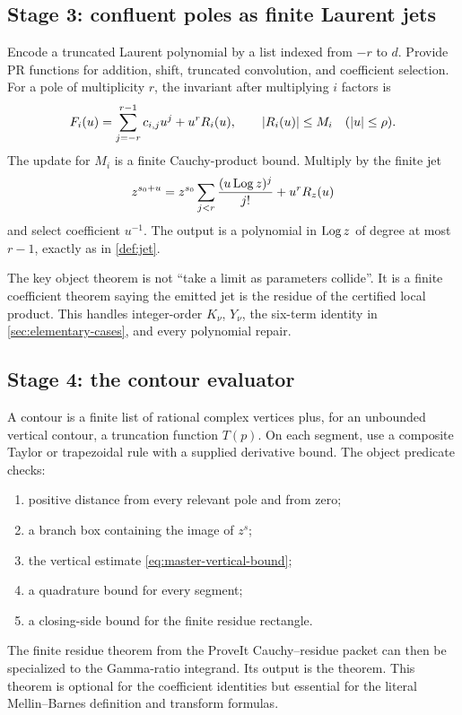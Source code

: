 \subsection{Stage 3: confluent poles as finite Laurent jets}

Encode a truncated Laurent polynomial by a list indexed from $-r$ to $d$.
Provide PR functions for addition, shift, truncated convolution, and coefficient
selection.  For a pole of multiplicity $r$, the invariant after multiplying
$i$ factors is
\[
 F_i(u)=\sum_{j=-r}^{r-1}c_{i,j}u^j+u^rR_i(u),
 \qquad \left|R_i(u)\right|\le M_i
 \quad(\left|u\right|\le\rho).
\]
The update for $M_i$ is a finite Cauchy-product bound.  Multiply by the finite
jet
\[
 z^{s_0+u}=z^{s_0}\sum_{j<r}\frac{(u\operatorname{Log} z)^j}{j!}+u^rR_z(u)
\]
and select coefficient $u^{-1}$.  The output is a polynomial in $\operatorname{Log} z$ of
degree at most $r-1$, exactly as in \cref{def:jet}.

The key object theorem is not ``take a limit as parameters collide''.  It is a
finite coefficient theorem saying the emitted jet is the residue of the
certified local product.  This handles integer-order $K_\nu$, $Y_\nu$, the
six-term identity in \cref{sec:elementary-cases}, and every polynomial repair.

\subsection{Stage 4: the contour evaluator}

A contour is a finite list of rational complex vertices plus, for an unbounded
vertical contour, a truncation function $T(p)$.  On each segment, use a
composite Taylor or trapezoidal rule with a supplied derivative bound.  The
object predicate  checks:
\begin{enumerate}
\item positive distance from every relevant pole and from zero;
\item a branch box containing the image of $z^s$;
\item the vertical estimate \eqref{eq:master-vertical-bound};
\item a quadrature bound for every segment;
\item a closing-side bound for the finite residue rectangle.
\end{enumerate}
The finite residue theorem from the ProveIt Cauchy--residue packet can then be
specialized to the Gamma-ratio integrand.  Its output is the
 theorem.  This theorem is optional for the
coefficient identities but essential for the literal Mellin--Barnes definition
and transform formulas.


